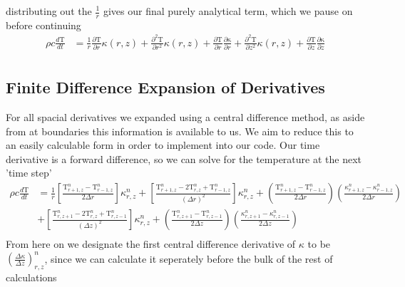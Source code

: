 \documentclass[12pt]{article}
\begin{document}
	  distributing out the $\frac{1}{r}$ gives our final purely analytical term, which we pause on before continuing
		\begin{equation} \label{eq:6}
		\begin{aligned}
		\rho c \frac{d\mathrm{T}}{dt} &= \frac{1}{r} \frac{\partial\mathrm{T}}{\partial r}\kappa(r, z) + \frac{\partial^2\mathrm{T}}{\partial r^2}\kappa(r, z)  + \frac{\partial\mathrm{T}}{\partial r} \frac{\partial\mathrm{\kappa}}{\partial r}  + \frac{\partial^2\mathrm{T}}{\partial z^2}\kappa(r, z) + \frac{\partial\mathrm{T}}{\partial z}\frac{\partial\mathrm{\kappa}}{\partial z} \\
		\end{aligned}
		\end{equation}
    \subsection{Finite Difference Expansion of Derivatives}
	  For all spacial derivatives we expanded using a central difference method, as aside from at boundaries this information is available to us. We aim to reduce this to an easily calculable form in order to implement into our code. Our time derivative is a forward difference, so we can solve for the temperature at the next 'time step'
		\begin{equation}
		\begin{aligned}
		\rho c \frac{d\mathrm{T}}{dt} &= \frac{1}{r} \left [\frac{\mathrm{T}^{n}_{r + 1, z} - \mathrm{T}^{n}_{r - 1, z}}{2\Delta r}  \right ]\kappa^{n}_{r, z} + \left [\frac{\mathrm{T}^{n}_{r + 1, z}  - 2 \mathrm{T}^{n}_{r, z} +  \mathrm{T}^{n}_{r - 1, z}}{(\Delta r)^2} \right ]  \kappa^{n}_{r, z} + (\frac{\mathrm{T}^{n}_{r + 1, z} - \mathrm{T}^{n}_{r - 1, z}}{2\Delta r}) (\frac{\kappa^{n}_{r + 1, z} - \kappa^{n}_{r - 1, z}}{2\Delta r}) \\
		&+ \left [\frac{\mathrm{T}^{n}_{r, z + 1}  - 2 \mathrm{T}^{n}_{r, z} +  \mathrm{T}^{n}_{r, z -1}}{(\Delta z)^2} \right ]\kappa^n_{r, z} + (\frac{\mathrm{T}^{n}_{r, z + 1} - \mathrm{T}^{n}_{r, z - 1}}{2\Delta z})(\frac{\kappa^{n}_{r, z + 1} - \kappa^{n}_{r,z - 1}}{2\Delta z}) \\
		\end{aligned}
		\end{equation}
		From here on we designate the first central difference derivative of $\kappa$ to be $(\frac{\Delta \kappa}{\Delta z})^n_{r, z}$, since we can calculate it seperately before the bulk of the rest of calculations 
\end{document}
